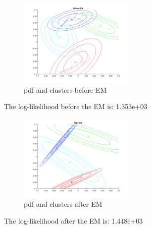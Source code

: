 \documentclass[conference]{IEEEtran}
\begin{document}
\begin{figure}[h!]
  	\centering
    \includegraphics[width=0.5\textwidth]{img/1before_em.png}
    \caption{pdf and clusters before EM}
    \label{fig:before_em}
\end{figure}
The log-likelihood before the EM is: 1.353e+03

\begin{figure}[h!]
  	\centering
    \includegraphics[width=0.5\textwidth]{img/1after_em.png}
    \caption{pdf and clusters after EM}
    \label{fig:after_em}
\end{figure}

The log-likelihood after the EM is: 1.448e+03
\newpage
~
\newpage
\end{document}
